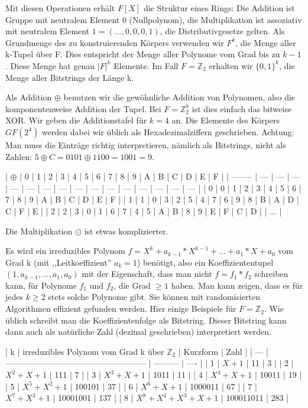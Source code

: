 \documentclass[a4paper]{article}
\begin{document}
\begin{multicols}{3}
    Mit diesen Operationen erhält $F[X]$ die Struktur eines Rings: Die Addition ist Gruppe mit neutralem Element 0 (Nullpolynom), die Multiplikation ist assoziativ mit neutralem Element $1=(...,0,0,0,1)$, die Distributivgesetze gelten.
    Als Grundmenge des zu konstruierenden Körpers verwenden wir $F^k$, die Menge aller k-Tupel über F. Dies entspricht der Menge aller Polynome vom Grad bis zu $k-1$. Diese Menge hat genau $|F|^k$ Elemente. Im Fall $F=\mathbb{Z}_2$ erhalten wir $\{0,1\}^k$, die Menge aller Bitstrings der Länge k.

    Als Addition $\oplus$ benutzen wir die gewöhnliche Addition von Polynomen, also die komponentenweise Addition der Tupel. Bei $F=\mathbb{Z}^k_2$ ist dies einfach das bitweise XOR. Wir geben die Additionstafel für $k=4$ an. Die Elemente des Körpers $GF(2^4)$ werden dabei wir üblich als Hexadezimalziffern geschrieben. Achtung: Man muss die Einträge richtig interpretieren, nämlich als Bitstrings, nicht als Zahlen: $5\oplus C=0101\oplus 1100=1001=9$.

    | $\oplus$ | 0   | 1   | 2   | 3   | 4   | 5   | 6   | 7   | 8   | 9   | A   | B   | C   | D   | E   | F |
    | -------- | --- | --- | --- | --- | --- | --- | --- | --- | --- | --- | --- | --- | --- | --- | --- |
    | 0        | 0   | 1   | 2   | 3   | 4   | 5   | 6   | 7   | 8   | 9   | A   | B   | C   | D   | E   | F |
    | 1        | 1   | 0   | 3   | 2   | 5   | 4   | 7   | 6   | 9   | 8   | B   | A   | D   | C   | F   | E |
    | 2        | 2   | 3   | 0   | 1   | 6   | 7   | 4   | 5   | A   | B   | 8   | 9   | E   | F   | C   | D |
    | ...      |

    Die Multiplikation $\odot$ ist etwas komplizierter.

    Es wird ein irreduzibles Polynom $f=X^k+a_{k-1}* X^{k-1}+...+a_1*X+a_0$ vom Grad k (mit ,,Leitkoeffizient'' $a_k=1$) benötigt, also ein Koeffiziententupel $(1,a_{k-1},...,a_1,a_0)$ mit der Eigenschaft, dass man nicht $f=f_1*f_2$ schreiben kann, für Polynome $f_1$ und $f_2$, die Grad $\geq 1$ haben. Man kann zeigen, dass es für jedes $k\geq 2$ stets solche Polynome gibt. Sie können mit randomisierten Algorithmen effizient gefunden werden. Hier einige Beispiele für $F=\mathbb{Z}_2$. Wie üblich schreibt man die Koeffizientenfolge als Bitstring. Dieser Bitstring kann dann auch als natürliche Zahl (dezimal geschrieben) interpretiert werden.

    | k   | irreduzibles Polynom vom Grad k über $\mathbb{Z}_2$ | Kurzform  | Zahl |
    | --- | --------------------------------------------------- | --------- | ---- |
    | 1   | $X+ 1$                                              | 11        | 3    |
    | 2   | $X^2 +X+ 1$                                         | 111       | 7    |
    | 3   | $X^3 +X+ 1$                                         | 1011      | 11   |
    | 4   | $X^4 +X+ 1$                                         | 10011     | 19   |
    | 5   | $X^5 +X^2 + 1$                                      | 100101    | 37   |
    | 6   | $X^6 +X+ 1$                                         | 1000011   | 67   |
    | 7   | $X^7 +X^3 + 1$                                      | 10001001  | 137  |
    | 8   | $X^8 +X^4 +X^3 +X+ 1$                               | 100011011 | 283  |


\end{multicols}
\end{document}
